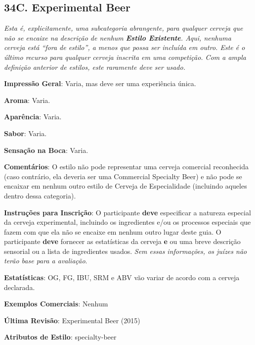 \subsection*{34C. Experimental Beer}
\textit{Esta é, explicitamente, uma subcategoria abrangente, para qualquer cerveja que não se encaixe na descrição de nenhum \textbf{Estilo Existente}. Aqui, nenhuma cerveja está “fora de estilo”, a menos que possa ser incluída em outro. Este é o último recurso para qualquer cerveja inscrita em uma competição. Com a ampla definição anterior de estilos, este raramente deve ser usado.}

\textbf{Impressão Geral}: Varia, mas deve ser uma experiência única.

\textbf{Aroma}: Varia.

\textbf{Aparência}: Varia.

\textbf{Sabor}: Varia.

\textbf{Sensação na Boca}: Varia.

\textbf{Comentários}: O estilo não pode representar uma cerveja comercial reconhecida (caso contrário, ela deveria ser uma Commercial Specialty Beer) e não pode se encaixar em nenhum outro estilo de Cerveja de Especialidade (incluindo aqueles dentro dessa categoria).

\textbf{Instruções para Inscrição}: O participante \textbf{deve} especificar a natureza especial da cerveja experimental, incluindo os ingredientes e/ou os processos especiais que fazem com que ela não se encaixe em nenhum outro lugar deste guia. O participante \textbf{deve} fornecer as estatísticas da cerveja \textbf{e} ou uma breve descrição sensorial ou a lista de ingredientes usados. \textit{Sem essas informações, os juízes não terão base para a avaliação}.

\textbf{Estatísticas}: OG, FG, IBU, SRM e ABV vão variar de acordo com a cerveja declarada.

\textbf{Exemplos Comerciais}: Nenhum

\textbf{Última Revisão}: Experimental Beer (2015)

\textbf{Atributos de Estilo}: specialty-beer
